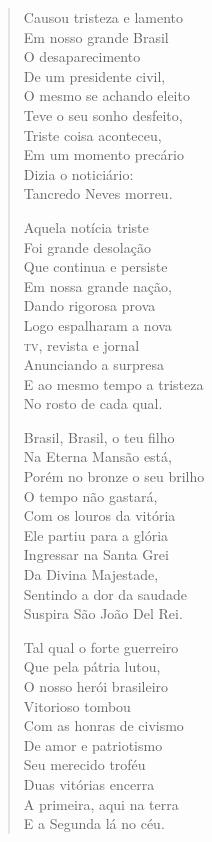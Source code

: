 \begin{verse}
Causou tristeza e lamento\\
Em nosso grande Brasil\\
O desaparecimento\\
De um presidente civil,\\
O mesmo se achando eleito\\
Teve o seu sonho desfeito,\\
Triste coisa aconteceu,\\
Em um momento precário\\
Dizia o noticiário:\\
Tancredo Neves morreu.

Aquela notícia triste\\
Foi grande desolação\\
Que continua e persiste\\
Em nossa grande nação,\\
Dando rigorosa prova\\
Logo espalharam a nova\\
\textsc{tv}, revista e jornal\\
Anunciando a surpresa\\
E ao mesmo tempo a tristeza\\
No rosto de cada qual.

Brasil, Brasil, o teu filho\\
Na Eterna Mansão está,\\
Porém no bronze o seu brilho\\
O tempo não gastará,\\
Com os louros da vitória\\
Ele partiu para a glória\\
Ingressar na Santa Grei\\
Da Divina Majestade,\\
Sentindo a dor da saudade\\
Suspira São João Del Rei.

Tal qual o forte guerreiro\\
Que pela pátria lutou,\\
O nosso herói brasileiro\\
Vitorioso tombou\\
Com as honras de civismo\\
De amor e patriotismo\\
Seu merecido troféu\\
Duas vitórias encerra\\
A primeira, aqui na terra\\
E a Segunda lá no céu.


\end{verse}
